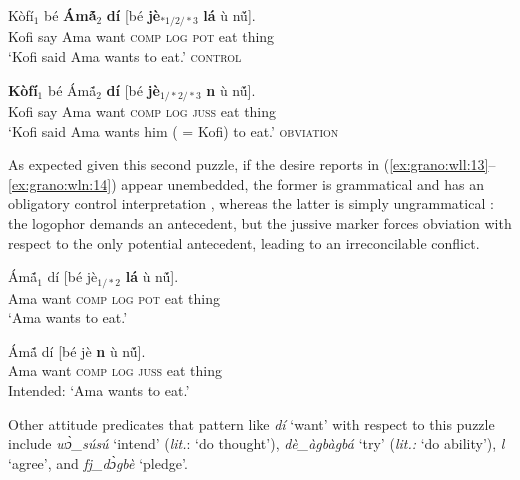 \documentclass[output=paper,modfonts,nonflat]{langsci/langscibook}
\begin{document}
\ea
\gll K\`of\'i$_{1}$ b\'e \textbf{\'Am\'{\~a}$_{2}$} \textbf{d{\Z}\'i} [b\'e \textbf{j\`e$_{*1/2/*3}$} \textbf{l\'a} {\D}\`u n\'{\~u}].\\
Kofi say Ama want \textsc{comp} \textsc{log} \textsc{pot} eat thing\\
\glt `Kofi said Ama wants to eat.' \label{ex:grano:wll:13}  \hfill \textsc{control}%
\z

\ea
\gll \textbf{K\`of\'i$_{1}$} b\'e  \'Am\'{\~a}$_{2}$ \textbf{d{\Z}\'i} [b\'e \textbf{j\`e$_{1/*2/*3}$} \textbf{n{\É}} {\D}\`u n\'{\~u}].\\
Kofi say Ama want \textsc{comp} \textsc{log} \textsc{juss} eat thing\\
\glt `Kofi said Ama wants him ( = Kofi) to eat.' \label{ex:grano:wln:14}  \hfill \textsc{obviation}
\z


As expected given this second puzzle, if the desire reports in (\ref{ex:grano:wll:13}--\ref{ex:grano:wln:14}) appear unembedded, the former is grammatical and has an obligatory control interpretation , whereas the latter is simply ungrammatical : the logophor demands an antecedent, but the jussive marker forces obviation with respect to the only potential antecedent, leading to an irreconcilable conflict.

\ea
\gll  \'Am\'{\~a}$_{1}$  d{\Z}\'i [b\'e  j\`e$_{1/*2}$ \textbf{l\'a} {\D}\`u n\'{\~u}].\\
Ama want \textsc{comp} \textsc{log} \textsc{pot} eat thing\\
\glt `Ama wants to eat.' \label{ex:grano:wll':15}  %
\z

\ea
\gll *\'Am\'{\~a} d{\Z}\'i [b\'e  j\`e \textbf{n{\É}} {\D}\`u n\'{\~u}].\\
Ama want \textsc{comp} \textsc{log} \textsc{juss} eat thing\\
\glt Intended: `Ama wants to eat.' \label{ex:grano:wln':16}  %
\z

 Other attitude predicates that pattern like \emph{d{\Z}\'i} `want' with respect to this puzzle include \emph{w{\`{ɔ}}\_s\'us\'u} `intend' (\emph{lit.}: `do thought'), \emph{d{\Z}\`e\_\`agb\`agb\'a} `try' (\emph{lit.:} `do ability'), \emph{l{\Ò}} `agree', and \emph{fj{\È}\_d{\Z}{\`{ɔ}}gb\`e} `pledge'. 
\end{document}
